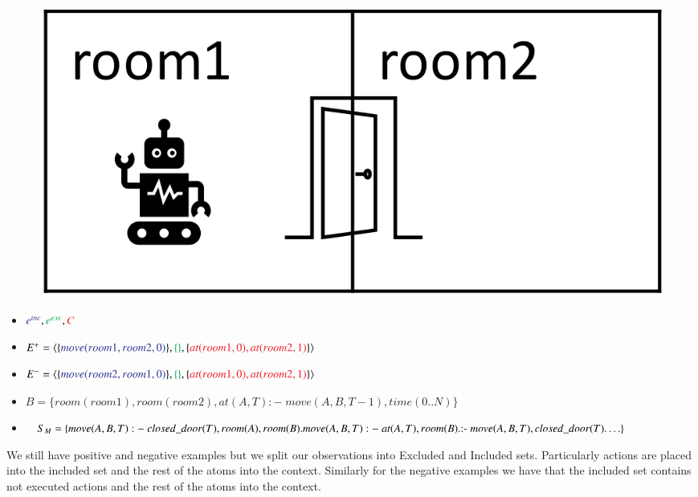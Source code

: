 \begin{minipage}[t]{0.2\textwidth}
    \begin{figure}[H]
        \includegraphics[width=\textwidth]{img/robot_room.png}
        \centering
    \end{figure}
\end{minipage}
\begin{minipage}[t]{0.8\textwidth}
    \begin{itemize}
        \item $\textcolor{Blue}{e^{inc}},\textcolor{Green}{e^{exc}},\textcolor{Red}{C}$
        \item $E^+ = \langle\{\textcolor{Blue}{move(room1,room2,0)}\},\textcolor{Green}{\{\}}, \{\textcolor{Red}{at(room1,0),at(room2,1)}\}\rangle$
        \item $E^- = \langle\{\textcolor{Blue}{move(room2,room1,0)}\},\textcolor{Green}{\{\}}, \{\textcolor{Red}{at(room1,0),at(room2,1)}\}\rangle$
        \item $B = \{room(room1), room(room2), at(A,T) :-\; move(A,B,T-1), time(0..N)\}$
        \item $S_{M}=\{\\
                    move(A,B,T) :-\; closed\_door(T), room(A), room(B). \\
                    move(A,B,T) :-\; at(A,T), room(B).\\
                    \text{:-}\; move(A,B,T), closed\_door(T).\\
                    \ldots\} \;$
    \end{itemize}
\end{minipage}

We still have positive and negative examples but we split our observations into Excluded and Included sets.
Particularly actions are placed into the included set and the rest of the atoms into the context.
Similarly for the negative examples we have that the included set contains not executed actions  and the rest of the atoms into the context.

